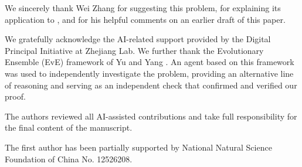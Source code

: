 \documentclass[11pt, a4paper]{amsart}
\theoremstyle{plain}
\theoremstyle{plain}
\theoremstyle{plain}
\theoremstyle{plain}
\theoremstyle{remark}
\theoremstyle{definition}
\theoremstyle{plain}
\numberwithin{equation}{section}
\begin{document}
We sincerely thank Wei Zhang for suggesting this problem, for explaining its application to \cite[Conjecture 3.6.10]{DZ}, and for his helpful comments on an earlier draft of this paper.

We gratefully acknowledge the AI-related support provided by the Digital Principal Initiative at Zhejiang Lab. We further thank the Evolutionary Ensemble (EvE) framework of Yu and Yang \cite{yu2026eve}. 
An agent based on this framework was used to independently investigate the problem, providing an alternative line of reasoning and serving as an independent check that confirmed and verified our proof.  

The authors reviewed all AI-assisted contributions and take full responsibility for the final content of the manuscript.

The first author has been partially supported by National Natural Science Foundation of China No. 12526208.





\end{document}
